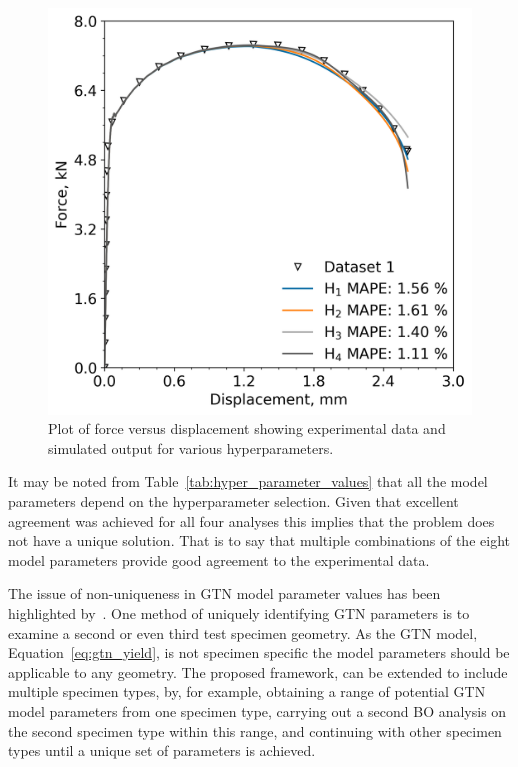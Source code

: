 \documentclass[preprint, review, 12pt]{elsarticle}
\begin{document}
	\begin{figure}[!htbp]
		\centering
		\includegraphics[width=\linewidth, height=0.4\textheight, keepaspectratio]{HYPERPARAMETERS}
		\caption{Plot of force versus displacement showing experimental data and simulated output for various hyperparameters.}
		\label{fig:unique}
	\end{figure}

	

	 It may be noted from Table~\ref{tab:hyper_parameter_values} that all the model parameters depend on the hyperparameter selection.
	Given that excellent agreement was achieved for all four analyses this implies that the problem does not have a unique solution.
	That is to say that multiple combinations of the eight model parameters provide good agreement to the experimental data.

	The issue of non-uniqueness in GTN model parameter values has been highlighted by~\cite{KIRAN2014}.
	One method of uniquely identifying GTN parameters is to examine a second or even third test specimen geometry.
	As the GTN model, Equation~\ref{eq:gtn_yield}, is not specimen specific the model parameters should be applicable to any geometry.
	The proposed framework, can be extended to include multiple specimen types, by, for example, obtaining a range of potential GTN model parameters from one specimen type, carrying out a second BO analysis on the second specimen type within this range, and continuing with other specimen types until a unique set of parameters is achieved.
	\clearpage
\end{document}
